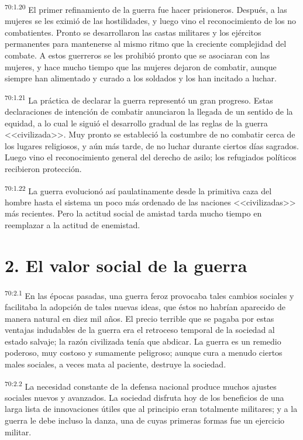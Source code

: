 \documentclass[twoside, 11pt]{book}
\begin{document}
\par
\textsuperscript{70:1.20} El primer refinamiento de la guerra fue hacer prisioneros. Después, a las mujeres se les eximió de las hostilidades, y luego vino el reconocimiento de los no combatientes. Pronto se desarrollaron las castas militares y los ejércitos permanentes para mantenerse al mismo ritmo que la creciente complejidad del combate. A estos guerreros se les prohibió pronto que se asociaran con las mujeres, y hace mucho tiempo que las mujeres dejaron de combatir, aunque siempre han alimentado y curado a los soldados y los han incitado a luchar.

\par
\textsuperscript{70:1.21} La práctica de declarar la guerra representó un gran progreso. Estas declaraciones de intención de combatir anunciaron la llegada de un sentido de la equidad, a lo cual le siguió el desarrollo gradual de las reglas de la guerra <<civilizada>>. Muy pronto se estableció la costumbre de no combatir cerca de los lugares religiosos, y aún más tarde, de no luchar durante ciertos días sagrados. Luego vino el reconocimiento general del derecho de asilo; los refugiados políticos recibieron protección.

\par
\textsuperscript{70:1.22} La guerra evolucionó así paulatinamente desde la primitiva caza del hombre hasta el sistema un poco más ordenado de las naciones <<civilizadas>> más recientes. Pero la actitud social de amistad tarda mucho tiempo en reemplazar a la actitud de enemistad.

\section*{2. El valor social de la guerra}
\par
\textsuperscript{70:2.1} En las épocas pasadas, una guerra feroz provocaba tales cambios sociales y facilitaba la adopción de tales nuevas ideas, que éstos no habrían aparecido de manera natural en diez mil años. El precio terrible que se pagaba por estas ventajas indudables de la guerra era el retroceso temporal de la sociedad al estado salvaje; la razón civilizada tenía que abdicar. La guerra es un remedio poderoso, muy costoso y sumamente peligroso; aunque cura a menudo ciertos males sociales, a veces mata al paciente, destruye la sociedad.

\par
\textsuperscript{70:2.2} La necesidad constante de la defensa nacional produce muchos ajustes sociales nuevos y avanzados. La sociedad disfruta hoy de los beneficios de una larga lista de innovaciones útiles que al principio eran totalmente militares; y a la guerra le debe incluso la danza, una de cuyas primeras formas fue un ejercicio militar.
\end{document}
